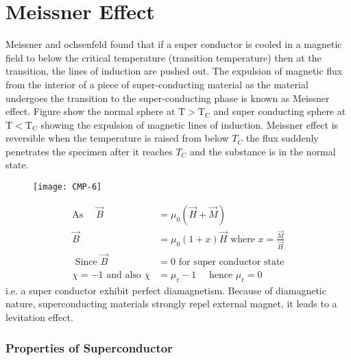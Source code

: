 \section{Meissner Effect}
Meissner and ochsenfeld found that if a super conductor is cooled in a magnetic field to below the critical temperature (transition temperature) then at the transition, the lines of induction are pushed out. The expulsion of magnetic flux from the interior of a piece of super-conducting material as the material undergoes the transition to the super-conducting phase is known as Meissner effect. Figure show the normal sphere at $\mathrm{T}>\mathrm{T}_{\mathrm{C}}$ and super conducting sphere at $\mathrm{T}<\mathrm{T}_{\mathrm{C}}$ showing the expulsion of magnetic lines of induction. Meissner effect is reversible when the temperature is raised from below $T_{C}$ the flux suddenly penetrates the specimen after it reaches $T_{C}$ and the substance is in the normal state.
\begin{figure}[H]
	\centering
	\texttt{[image: CMP-6]}
	\caption{}
	\label{}
\end{figure}
\begin{align*}
\text{As }\quad 
\vec{B}&=\mu_{0}(\vec{H}+\vec{M})\\
\vec{B}&=\mu_{0}(1+x) \vec{H}
\text{ where  }x=\frac{\vec{M}}{\vec{H}}\\
\text{ Since }
\vec{B}&=0\text{ for super conductor state}\\
\chi=-1 \text { and also } \chi&=\mu_{\mathrm{r}}-1\quad \text { hence } \mu_{\mathrm{r}}=0
\end{align*}
i.e. a super conductor exhibit perfect diamagnetism. Because of diamagnetic nature, superconducting materials strongly repel external magnet, it leads to a levitation effect.
\subsubsection{Properties of Superconductor}

